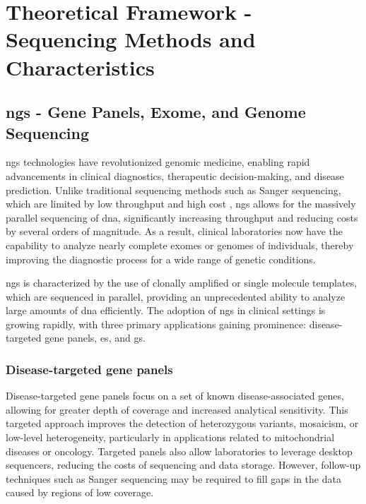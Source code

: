 \section{Theoretical Framework - Sequencing Methods and Characteristics} \label{sec:intro_sequencing}

\subsection{\acl{ngs} - Gene Panels, Exome, and Genome Sequencing} \label{subsec:ngs_gp_es_gs}


\acl{ngs} technologies have revolutionized genomic medicine, enabling rapid advancements in clinical diagnostics, therapeutic decision-making, and disease prediction. Unlike traditional sequencing methods such as Sanger sequencing, which are limited by low throughput and high cost \cite{cost}, \ac{ngs} allows for the massively parallel sequencing of \ac{dna}, significantly increasing throughput and reducing costs by several orders of magnitude. As a result, clinical laboratories now have the capability to analyze nearly complete exomes or genomes of individuals, thereby improving the diagnostic process for a wide range of genetic conditions. \cite{Rehm2013}

\ac{ngs} is characterized by the use of clonally amplified or single molecule templates, which are sequenced in parallel, providing an unprecedented ability to analyze large amounts of \ac{dna} efficiently. The adoption of \ac{ngs} in clinical settings is growing rapidly, with three primary applications gaining prominence: disease-targeted gene panels, \ac{es}, and \ac{gs}. \cite{Rehm2013}

\subsubsection{\textbf{Disease-targeted gene panels}} \label{subsubsubsec:ngs_panels}

Disease-targeted gene panels focus on a set of known disease-associated genes, allowing for greater depth of coverage and increased analytical sensitivity. This targeted approach improves the detection of heterozygous variants, mosaicism, or low-level heterogeneity, particularly in applications related to mitochondrial diseases or oncology. Targeted panels also allow laboratories to leverage desktop sequencers, reducing the costs of sequencing and data storage. However, follow-up techniques such as Sanger sequencing may be required to fill gaps in the data caused by regions of low coverage. \cite{Rehm2013}

